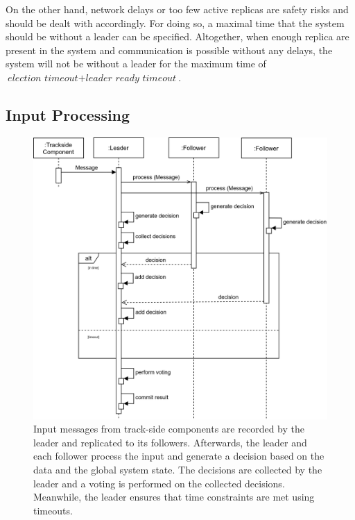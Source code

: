 On the other hand, network delays or too few active replicas are safety risks and should be dealt with accordingly.
For doing so, a maximal time that the system should be without a leader can be specified.
Altogether, when enough replica are present in the system and communication is possible without any delays, the system will not be without a leader for the maximum time of $\textit{election timeout} + \textit{leader ready timeout}$.

\subsection{Input Processing}
\label{subsec:ImpInputProcessing}
\begin{figure}[!hb]
	\centering
	\includegraphics[width=0.75\linewidth]{images/sequence/CollectResults}
	\caption{Input messages from track-side components are recorded by the leader and replicated to its followers. Afterwards, the leader and each follower process the input and generate a decision based on the data and the global system state. The decisions are collected by the leader and a voting is performed on the collected decisions. Meanwhile, the leader ensures that time constraints are met using timeouts.}
	\label{fig:SeqCollectResults}
\end{figure}

